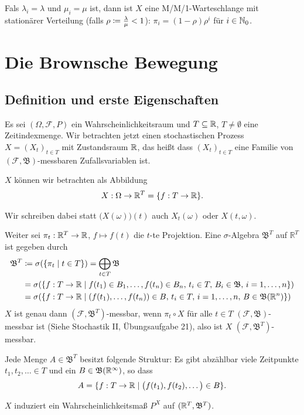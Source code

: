 \documentclass[a4paper,twoside,DIV15,BCOR12mm]{scrbook}
\newcommand{\cF}{\mathcal F}
\newcommand{\borel}{{\mathfrak B}}
\begin{document}
\begin{beispiel}
Fals $\lambda_i=\lambda$ und $\mu_i=\mu$ ist, dann ist $X$ eine M/M/1-Warteschlange mit stationärer Verteilung (falls $\rho\da \frac\lambda\mu < 1$): $\pi_i=(1-\rho)\rho^i$ für $i\in\mathbb{N}_0$.
\end{beispiel}

\chapter{Die Brownsche Bewegung}

\section{Definition und erste Eigenschaften}

Es sei $(\Omega, \cF, P)$ ein Wahrscheinlichkeitsraum und $T\subseteq\mathbb{R}$, $T\ne\emptyset$ eine Zeitindexmenge. Wir betrachten jetzt einen stochastischen Prozess $X=(X_t)_{t\in T}$ mit Zustandsraum $\mathbb{R}$, das heißt dass $(X_t)_{t\in T}$ eine Familie von $(\cF, \borel)$-messbaren Zufallsvariablen ist.

$X$ können wir betrachten als Abbildung
\begin{align*}
X:\Omega \to \mathbb{R}^T=\{f:T\to \mathbb{R}\}.
\end{align*}

Wir schreiben dabei statt $\big(X(\omega)\big)(t)$ auch $X_t(\omega)$ oder $X(t,\omega)$.

Weiter sei $\pi_t:\mathbb{R}^T \to \mathbb{R}$, $f\mapsto f(t)$ die $t$-te Projektion. Eine $\sigma$-Algebra $\borel^T$ auf $\mathbb R^T$ ist gegeben durch
\begin{align*}
\borel^T &\da \sigma(\{\pi_t\mid t\in T\}) = \bigoplus_{t\in T}\borel \\
&= \sigma(\{f:T\to \MdR \mid f(t_1)\in B_1,\ldots,f(t_n)\in B_n,\, t_i\in T,\, B_i \in \borel,\, i=1,\ldots,n\}) \\
&= \sigma(\{f:T\to \MdR \mid (f(t_1),\ldots,f(t_n))\in B,\, t_i\in T,\, i=1,\ldots,n,\, B\in \borel(\MdR^n)\})
\end{align*}
$X$ ist genau dann $(\cF,\borel^T)$-messbar, wenn $\pi_t\circ X$ für alle $t\in T$ $(\cF,\borel)$-messbar ist (Siehe Stochastik II, Übungsaufgabe 21), also ist $X$ $(\cF,\borel^T)$-messbar.

Jede Menge $A\in \borel^T$ besitzt folgende Struktur: Es gibt abzählbar viele Zeitpunkte $t_1,t_2,\ldots\in T$ und ein $B\in\borel(\MdR^\infty)$, so dass 
\[
A= \{f:T\to \mathbb{R} \mid \big(f(t_1),f(t_2),\ldots\big) \in B\}.
\]

$X$ induziert ein Wahrscheinlichkeitsmaß $P^X$ auf $(\MdR^T,\borel^T)$.
\end{document}
